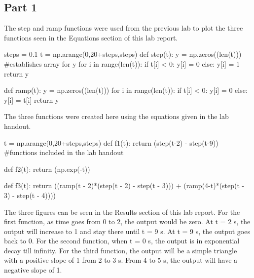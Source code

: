 \documentclass[12pt]{article}
\begin{document}
\subsection{Part 1}
The step and ramp functions were used from the previous lab to plot the three functions seen in the Equations section of this lab report. 
\begin{python}
steps = 0.1
t = np.arange(0,20+steps,steps)
def step(t):
    y = np.zeros((len(t))) #establishes array for y
    for i in range(len(t)):
        if t[i] < 0:
             y[i] = 0 
        else:
             y[i] = 1
    return y

def ramp(t):
    y = np.zeros((len(t)))
    for i in range(len(t)):
        if t[i] < 0:
            y[i] = 0
        else:
            y[i] = t[i]
    return y
\end{python}  
The three functions were created here using the equations given in the lab handout.
\begin{python}
t = np.arange(0,20+steps,steps)
def f1(t):
    return (step(t-2) - step(t-9)) #functions included in the lab handout
 
def f2(t):
    return (np.exp(-t))
   
def f3(t): 
    return ((ramp(t - 2)*(step(t - 2) - step(t - 3))) + 
           (ramp(4-t)*(step(t - 3) - step(t - 4))))
\end{python}
The three figures can be seen in the Results section of this lab report.
\newline
For the first function, as time goes from 0 to 2, the output would be zero. At t = 2 s, the output will increase to 1 and stay there until t = 9 s. At t = 9 s, the output goes back to 0.
\newline
For the second function, when t = 0 s, the output is in exponential decay till infinity.
\newline
For the third function, the output will be a simple triangle with a positive slope of 1 from 2 to 3 s. From 4 to 5 s, the output will have a negative slope of 1.
\end{document}
